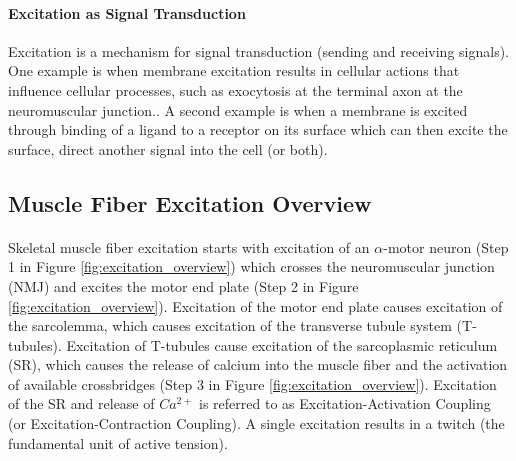 \paragraph{Excitation as Signal Transduction}
Excitation is a mechanism for signal transduction (sending and receiving signals). One example is when membrane excitation results in cellular actions that influence cellular processes, such as exocytosis at the terminal axon at the neuromuscular junction.\footnotemark{}. A second example is when a membrane is excited through binding of a ligand\footnotemark{} to a receptor on its surface which can then excite the surface, direct another signal into the cell (or both). 

\subsection{Muscle Fiber Excitation Overview}
\paragraph{}

Skeletal muscle fiber excitation starts with excitation of an $\alpha$-motor neuron (Step 1 in Figure \ref{fig:excitation_overview}) which crosses the neuromuscular junction (NMJ) and excites the motor end plate (Step 2 in Figure \ref{fig:excitation_overview}). Excitation of the motor end plate causes excitation of the sarcolemma, which causes excitation of the transverse tubule system (T-tubules). Excitation of T-tubules cause excitation of the sarcoplasmic reticulum (SR), which causes the release of calcium into the muscle fiber and the activation of available crossbridges (Step 3 in Figure \ref{fig:excitation_overview}). Excitation of the SR and release of $Ca^{2+}$ is referred to as Excitation-Activation Coupling (or Excitation-Contraction Coupling). A single excitation results in a twitch (the fundamental unit of active tension).

